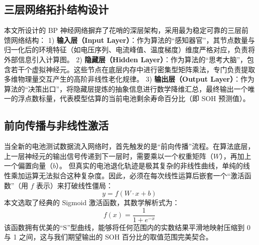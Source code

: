 \documentclass[10pt, a4paper, twocolumn]{ctexart}
\begin{document}
\subsection{三层网络拓扑结构设计}
本文所设计的 BP 神经网络摒弃了花哨的深层架构，采用最为稳定可靠的三层前馈网络结构：
1) \textbf{输入层（Input Layer）}：作为算法的“感知器官”，其节点数量与归一化后的环境特征（如电压序列、电流峰值、温度梯度）维度严格对应，负责将外部信息引入计算图。
2) \textbf{隐藏层（Hidden Layer）}：作为算法的“思考大脑”，包含若干个虚拟神经元。这些节点在底层内存中进行密集型矩阵乘法，专门负责提取多维物理量交互产生的高阶非线性老化规律。
3) \textbf{输出层（Output Layer）}：作为算法的“决策出口”，将隐藏层提炼的抽象信息进行数学降维汇总，最终输出一个唯一的浮点数标量，代表模型估算的当前电池剩余寿命百分比（即 SOH 预测值）。

\subsection{前向传播与非线性激活}
当全新的电池测试数据流入网络时，首先触发的是“前向传播”流程。在算法底层，上一层神经元的输出信号传递到下一层时，需要乘以一个权重矩阵（$W$），再加上一个偏置向量（$b$）。
但真实的电池退化轨迹是极其复杂的非线性曲线，单纯的线性乘加运算无法拟合这种复杂度。因此，必须在每次线性运算后嵌套一个“激活函数”（用 $f$ 表示）来打破线性僵局：
\begin{equation}
    y = f(W \cdot x + b) 
\end{equation}
本文选取了经典的 Sigmoid 激活函数，其数学解析式为：
\begin{equation}
    f(x) = \frac{1}{1 + e^{-x}} 
\end{equation}
该函数拥有优美的“S”型曲线，能够将任何范围内的实数结果平滑地映射压缩到 0 与 1 之间，这与我们期望输出的 SOH 百分比的取值范围完美契合。
\end{document}
